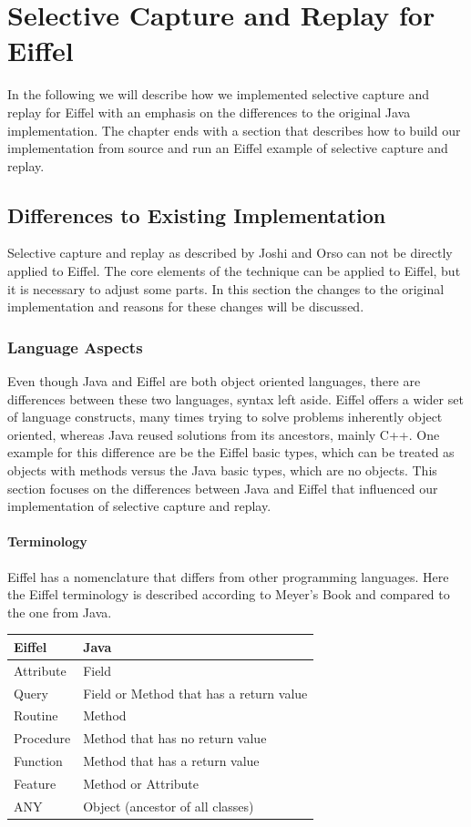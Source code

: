 \chapter{Selective Capture and Replay for Eiffel}
In the following we will describe how we implemented selective capture and replay for Eiffel with an emphasis on the differences to the original Java implementation. The chapter ends with a section that describes how to build our implementation from source and run an Eiffel example of selective capture and replay.

\eiffellisting
\section{Differences to Existing Implementation}
Selective capture and replay as described by Joshi and Orso \cite{orso05may} can not be directly applied to Eiffel. The core elements of the technique can be applied to Eiffel, but it is necessary to adjust some parts. In this section the changes to the original implementation and reasons for these changes will be discussed.

\subsection{Language Aspects}
Even though Java and Eiffel are both object oriented languages, there are differences between these two languages, syntax left aside. Eiffel offers a wider set of language constructs, many times trying to solve problems inherently object oriented, whereas Java reused solutions from its ancestors, mainly C++. One example for this difference are be the Eiffel basic types, which can be treated as objects with methods versus the Java basic types, which are no objects. This section focuses on the differences between Java and Eiffel that influenced our implementation of selective capture and replay.

\subsubsection{Terminology} %
Eiffel has a nomenclature that differs from other programming languages. Here the Eiffel terminology is described according to Meyer's Book \cite{oosc2} and compared to the one from Java.
\begin{center}
\begin{tabular}[]{|l|l|} \hline
 \textbf{Eiffel}&\textbf{Java} \\ \hline
 Attribute&Field \\ \hline
 Query&Field or Method that has a return value \\ \hline
 Routine&Method \\ \hline
 Procedure&Method that has no return value \\ \hline
 Function&Method that has a return value \\ \hline
 Feature&Method or Attribute \\ \hline
 ANY&Object (ancestor of all classes) \\ \hline
\end{tabular} 
\end{center}

